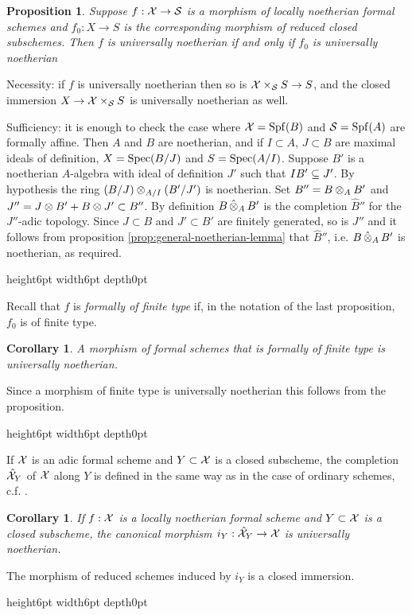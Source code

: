 \documentclass{article}
\theoremstyle{change}
\newtheorem{prop}[subsubsection]{Proposition}
\newtheorem{cor}[subsubsection]{Corollary}
\numberwithin{equation}{subsubsection}
\newcommand{\demobox}{\vrule height6pt width6pt depth0pt}
\newenvironment{demo}{\noindent{\it Proof.}}
{{\unskip\nobreak\hfil\qquad
\demobox\parfillskip=0pt\par}
\medskip}
\begin{document}
\begin{prop}\label{prop:noeth-if-red-is noeth}
  Suppose $f:{\cal X}\to{\cal S}$ is a morphism of locally noetherian formal
  schemes and $f_0:X\to S$ is the corresponding morphism of reduced
  closed subschemes. Then $f$ is universally noetherian if and only if
  $f_0$ is universally noetherian
\end{prop}
\begin{demo}
  Necessity: if $f$ is universally noetherian then so is
  ${\cal X}\times_{\cal S} S\to S$, and the closed immersion $X\to{\cal X}\times_{\cal S}
  S$ is universally noetherian as well.

  Sufficiency: it is enough to check the case where ${\cal X}={\operatorname{Spf}({B})}$ and
  ${\cal S}={\operatorname{Spf}({A})}$ are formally affine. Then $A$ and $B$ are noetherian,
  and if $I\subset A$, $J\subset B$ are maximal ideals of definition,
  $X={\operatorname{Spec}({B/J})}$ and $S={\operatorname{Spec}({A/I})}$. Suppose $B'$ is a noetherian
  $A$-algebra with ideal of definition $J'$ such that $IB'\subseteq J'$.
  By hypothesis the ring $(B/J)\otimes_{A/I}(B'/J')$ is noetherian.  Set
  $B''=B\otimes_AB'$ and $J''=J\otimes B'+B\otimes J'\subset B''$. By
  definition $B\mathop{\hat\otimes}_AB'$ is the completion $\hat B''$ for the
  $J''$-adic topology. Since $J\subset B$ and $J'\subset B'$ are
  finitely generated, so is $J''$ and it follows from proposition
  \ref{prop:general-noetherian-lemma} that $\hat B''$,
  i.e. $B\mathop{\hat\otimes}_AB'$ is noetherian, as required.
\end{demo}

Recall that $f$ is \textit{formally of finite type} if, in the
notation of the last proposition, $f_0$ is of finite type.

\begin{cor}\label{cor:fft-is-noeth}
  A morphism of formal schemes that is formally of finite type is
  universally noetherian.
\end{cor}
\begin{demo}
  Since a morphism of finite type is universally noetherian this
  follows from the proposition.
\end{demo}

If ${\cal X}$ is an adic formal scheme and $Y\subset{\cal X}$ is a closed
subscheme, the completion $\hat{{\cal X}}_Y$ of ${\cal X}$ along $Y$ is defined in
the same way as in the case of ordinary schemes, c.f. \cite[I
Ch. 10]{EGA}.

\begin{cor}\label{cor:completion-is-noeth}
  If $f:{\cal X}$ is a locally noetherian formal scheme and $Y\subset{\cal X}$
  is a closed subscheme, the canonical morphism $i_Y:\hat{{\cal X}}_Y\to{\cal X}$
  is universally noetherian.
\end{cor}
\begin{demo}
  The morphism of reduced schemes induced by $i_Y$ is a closed
  immersion.
\end{demo}
\end{document}
